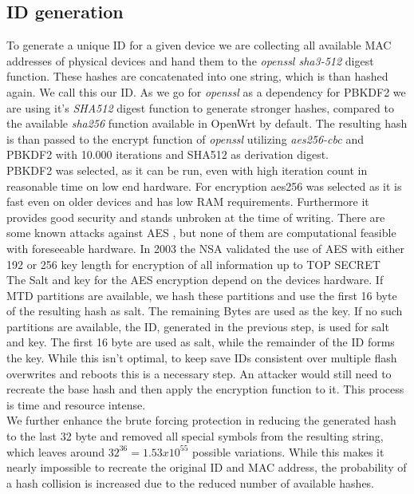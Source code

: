 \subsection{ID generation}
    To generate a unique ID for a given device we are collecting all available MAC addresses of physical devices and hand them to the \textit{openssl sha3-512} digest function. These hashes are concatenated into one string, which is than hashed again. We call this our ID. As we go for \textit{openssl} as a dependency for PBKDF2 we are using it's \textit{SHA512} digest function to generate stronger hashes, compared to the available \textit{sha256} function available in OpenWrt by default. The resulting hash is than passed to the encrypt function of \textit{openssl} utilizing \textit{aes256-cbc} and PBKDF2 with 10.000 iterations and SHA512 as derivation digest.\\
    PBKDF2 was selected, as it can be run, even with high iteration count in reasonable time on low end hardware\cite{ertaul_implementation_2016}. For encryption aes256 was selected as it is fast even on older devices and has low RAM requirements. Furthermore it provides good security and stands unbroken at the time of writing. There are some known attacks against AES \cite{schneier_another_2009}\cite{lu_new_2008}\cite{bernstein_cache-timing_nodate}\cite{biryukov_key_2009}, but none of them are computational feasible with foreseeable hardware. In 2003 the NSA validated the use of AES with either 192 or 256 key length for encryption of all information up to TOP SECRET\cite{noauthor_national_2003}\\
    
    The Salt and key for the AES encryption depend on the devices hardware. If MTD partitions are available, we hash these partitions and use the first 16 byte of the resulting hash as salt. The remaining Bytes are used as the key. If no such partitions are available, the ID, generated in the  previous step, is used for salt and key. The first 16 byte are used as salt, while the remainder of the ID forms the key. While this isn't optimal, to keep save IDs consistent over multiple flash overwrites and reboots this is a necessary step. An attacker would still need to recreate the base hash and then apply the encryption function to it. This process is time and resource intense.\\
    
     We further enhance the brute forcing protection in reducing the generated hash to the last 32 byte and removed all special symbols from the resulting string, which leaves around $32^{36} = 1.53x10^{55}$ possible variations. While this makes it nearly impossible to recreate the original ID and MAC address, the probability of a hash collision is increased due to the reduced number of available hashes.\\
    
